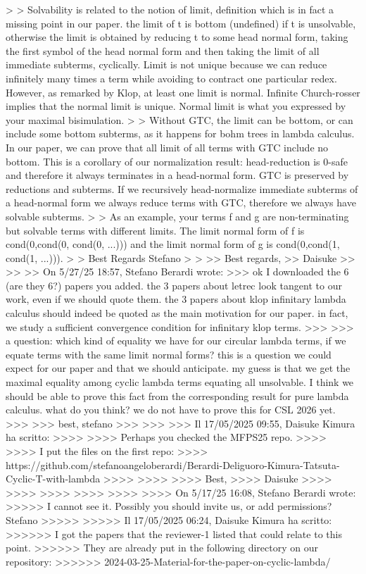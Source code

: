 >
>     Solvability is related to the notion of limit, definition which is in fact a missing point in our paper. the limit of t is bottom (undefined) if t is unsolvable, otherwise the limit is obtained by reducing t to some head normal form, taking the first symbol of the head normal form and then taking the limit of all immediate subterms, cyclically. Limit is not unique because we can reduce infinitely many times a term while avoiding to contract one particular redex. However, as remarked by Klop, at least one limit is normal. Infinite Church-rosser implies that the normal limit is unique. Normal limit is what you expressed by your maximal bisimulation.
>
>     Without GTC, the limit can be bottom, or can include some bottom subterms, as it happens for bohm trees in lambda calculus.  In our paper, we can prove that all limit of all terms with GTC include no bottom. This is a corollary of our normalization result: head-reduction is 0-safe and therefore it always terminates in a head-normal form. GTC is preserved by reductions and subterms. If we recursively head-normalize immediate subterms of a head-normal form we always reduce terms with GTC, therefore we always have solvable subterms.
>
>     As an example, your terms f and g are non-terminating but solvable terms with different limits. The limit normal form of f is cond(0,cond(0, cond(0, ...))) and the limit normal form of g is cond(0,cond(1, cond(1, ...))).
>
>     Best Regards Stefano
>
>
>> Best regards,
>> Daisuke
>>
>>
>> On 5/27/25 18:57, Stefano Berardi wrote:
>>>     ok I downloaded the 6 (are they 6?) papers you added. the 3 papers about letrec look tangent to our work, even if we should quote them. the 3 papers about klop infinitary lambda calculus should indeed be quoted as the main motivation for our paper. in fact, we study a sufficient convergence condition for infinitary klop terms.
>>>
>>>      a question: which kind of equality we have for our circular lambda terms, if we equate terms with the same limit normal forms? this is a question we could expect for our paper and that we should anticipate. my guess is that we get the maximal equality among cyclic lambda terms equating all unsolvable. I think we should be able to prove this fact from the corresponding result for pure lambda calculus. what do you think? we do not have to prove this for CSL 2026 yet.
>>>
>>>      best, stefano
>>>
>>>
>>> Il 17/05/2025 09:55, Daisuke Kimura ha scritto:
>>>>
>>>> Perhaps you checked the MFPS25 repo.
>>>>
>>>> I put the files on the first repo:
>>>> https://github.com/stefanoangeloberardi/Berardi-Deliguoro-Kimura-Tatsuta-Cyclic-T-with-lambda
>>>>
>>>>
>>>> Best,
>>>> Daisuke
>>>>
>>>>
>>>>
>>>>
>>>>
>>>> On 5/17/25 16:08, Stefano Berardi wrote:
>>>>> I cannot see it. Possibly you should invite us, or add permissions? Stefano
>>>>>
>>>>> Il 17/05/2025 06:24, Daisuke Kimura ha scritto:
>>>>>> I got the papers that the reviewer-1 listed that could relate to this point.
>>>>>> They are already put in the following directory on our repository:
>>>>>> 2024-03-25-Material-for-the-paper-on-cyclic-lambda/

